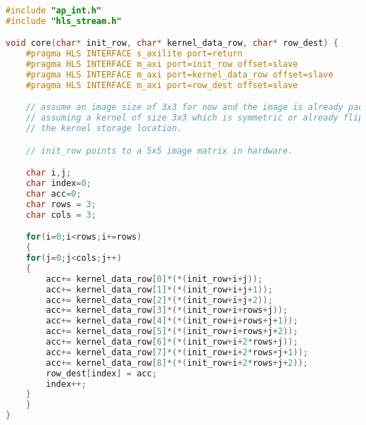 \singlespacing
\scriptsize
\begin{lstlisting}[language=C++, caption=Core Vivado HLS, label={lst:convolution_engine_vivado_hls}]
#include "ap_int.h"
#include "hls_stream.h"

void core(char* init_row, char* kernel_data_row, char* row_dest) {
    #pragma HLS INTERFACE s_axilite port=return
    #pragma HLS INTERFACE m_axi port=init_row offset=slave
    #pragma HLS INTERFACE m_axi port=kernel_data_row offset=slave
    #pragma HLS INTERFACE m_axi port=row_dest offset=slave

    // assume an image size of 3x3 for now and the image is already padded with zeros.
    // assuming a kernel of size 3x3 which is symmetric or already flipped stored at 
    // the kernel storage location.

    // init_row points to a 5x5 image matrix in hardware.

    char i,j;
    char index=0;
    char acc=0;
    char rows = 3; 
    char cols = 3;

    for(i=0;i<rows;i+=rows)
    {
	for(j=0;j<cols;j++)
	{
		acc+= kernel_data_row[0]*(*(init_row+i+j));
		acc+= kernel_data_row[1]*(*(init_row+i+j+1));
		acc+= kernel_data_row[2]*(*(init_row+i+j+2));
		acc+= kernel_data_row[3]*(*(init_row+i+rows+j));
		acc+= kernel_data_row[4]*(*(init_row+i+rows+j+1));
		acc+= kernel_data_row[5]*(*(init_row+i+rows+j+2));
		acc+= kernel_data_row[6]*(*(init_row+i+2*rows+j));
		acc+= kernel_data_row[7]*(*(init_row+i+2*rows+j+1));
		acc+= kernel_data_row[8]*(*(init_row+i+2*rows+j+2));
		row_dest[index] = acc;
		index++;
	}
    }
}
\end{lstlisting}
\normalsize
\doublespacing
